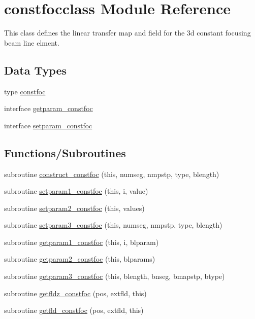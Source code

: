 \hypertarget{namespaceconstfocclass}{}\section{constfocclass Module Reference}
\label{namespaceconstfocclass}


This class defines the linear transfer map and field for the 3d constant focusing beam line elment.  


\subsection*{Data Types}
\begin{DoxyCompactItemize}
\item 
type \mbox{\hyperlink{namespaceconstfocclass_structconstfocclass_1_1constfoc}{constfoc}}
\item 
interface \mbox{\hyperlink{interfaceconstfocclass_1_1getparam__constfoc}{getparam\+\_\+constfoc}}
\item 
interface \mbox{\hyperlink{interfaceconstfocclass_1_1setparam__constfoc}{setparam\+\_\+constfoc}}
\end{DoxyCompactItemize}
\subsection*{Functions/\+Subroutines}
\begin{DoxyCompactItemize}
\item 
subroutine \mbox{\hyperlink{namespaceconstfocclass_a36197970c1524c85aeaea51d39f0ede7}{construct\+\_\+constfoc}} (this, numseg, nmpstp, type, blength)
\item 
subroutine \mbox{\hyperlink{namespaceconstfocclass_a14001bee7b5f9c4138d8042dcc94955c}{setparam1\+\_\+constfoc}} (this, i, value)
\item 
subroutine \mbox{\hyperlink{namespaceconstfocclass_a36ac221c9fb8e90f23b97b10cc272775}{setparam2\+\_\+constfoc}} (this, values)
\item 
subroutine \mbox{\hyperlink{namespaceconstfocclass_a9d02ddbf03689cdd653805ca5a56856e}{setparam3\+\_\+constfoc}} (this, numseg, nmpstp, type, blength)
\item 
subroutine \mbox{\hyperlink{namespaceconstfocclass_ab906b8830f5fb2cec09297d5004494e9}{getparam1\+\_\+constfoc}} (this, i, blparam)
\item 
subroutine \mbox{\hyperlink{namespaceconstfocclass_a59ea6cb7198ad0bf8446abe6978a9069}{getparam2\+\_\+constfoc}} (this, blparams)
\item 
subroutine \mbox{\hyperlink{namespaceconstfocclass_ae1fe9fc46cca742a797c388465086489}{getparam3\+\_\+constfoc}} (this, blength, bnseg, bmapstp, btype)
\item 
subroutine \mbox{\hyperlink{namespaceconstfocclass_a11f9a7cebf07bf044485eb4686f9357e}{getfldz\+\_\+constfoc}} (pos, extfld, this)
\item 
subroutine \mbox{\hyperlink{namespaceconstfocclass_a34425bf98b4a4cff016108f25a629dff}{getfld\+\_\+constfoc}} (pos, extfld, this)
\end{DoxyCompactItemize}
